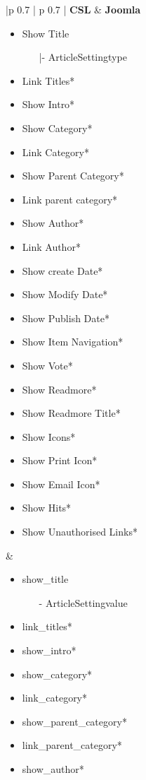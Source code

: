 \begin{minipage}{0.7\textwidth}
\begin{tabular}{|p {0.7\textwidth} | p {0.7\textwidth} |}
\hline
\textbf{CSL} & \textbf{Joomla} \\ 
\hline
\begin{itemize}
\item Show Title
	\begin{enumerate}
	\item[|-]ArticleSettingtype
	\end{enumerate}
\item Link Titles*
\item Show Intro*
\item Show Category*
\item Link Category*
\item Show Parent Category*
\item Link parent category*
\item Show Author*
\item Link Author*
\item Show create Date*
\item Show Modify Date*
\item Show Publish Date*
\item Show Item Navigation*
\item Show Vote*
\item Show Readmore*
\item Show Readmore Title*
\item Show Icons*
\item Show Print Icon*
\item Show Email Icon*
\item Show Hits*
\item Show Unauthorised Links*
\end{itemize} 
&
\begin{itemize}
\item show\_title
	\begin{enumerate}
     \item[-]ArticleSettingvalue
	\end{enumerate}	
\item link\_titles*
\item show\_intro*
\item show\_category*
\item link\_category*
\item show\_parent\_category*
\item link\_parent\_category*
\item show\_author*

\end{itemize}
\end{tabular}
\end{minipage}
